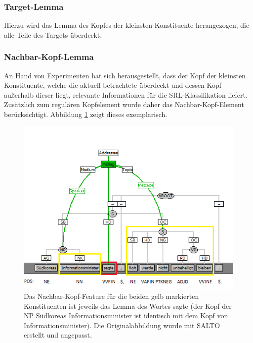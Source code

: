 \documentclass[12pt]{article}
\begin{document}
\subsubsection*{Target-Lemma}

Hierzu wird das Lemma des Kopfes der kleinsten Konstituente herangezogen, die alle Teile des Targets überdeckt.

\subsubsection*{Nachbar-Kopf-Lemma}

An Hand von Experimenten hat sich herausgestellt, dass der Kopf der kleinsten Konstituente, welche die aktuell betrachtete überdeckt und dessen Kopf außerhalb dieser liegt, relevante Informationen für die SRL-Klassifikation liefert. Zusätzlich zum regulären Kopfelement wurde daher das Nachbar-Kopf-Element berücksichtigt. Abbildung \ref{nextHead} zeigt dieses exemplarisch.  

	\begin{figure}[tb!]
		\centering
		\includegraphics{images/nextHead.png}
		\caption[Das Nachbar-Kopf-Feature]{Das Nachbar-Kopf-Feature für die beiden gelb markierten Konstituenten ist jeweils das Lemma des Wortes \glqq{}sagte\grqq{} (der Kopf der NP \glqq{}Südkoreas Informationsminister\grqq{} ist identisch mit dem Kopf von \glqq{}Informationsminister\grqq{}). Die Originalabbildung wurde mit SALTO\citep{burchardt06salto} erstellt und angepasst.}
		\label{nextHead}
	\end{figure}
\end{document}
